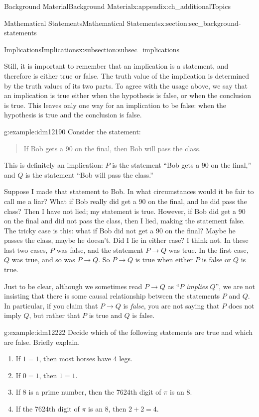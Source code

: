 \documentclass[oneside,10pt,]{book}
\numberwithin{equation}{chapter}
\def\imp{\rightarrow}
\begin{document}
\begin{appendixptx}{Background Material}{}{Background Material}{}{}{x:appendix:ch_additionalTopics}
\begin{sectionptx}{Mathematical Statements}{}{Mathematical Statements}{}{}{x:section:sec_background-statements}
\begin{subsectionptx}{Implications}{}{Implications}{}{}{x:subsection:subsec_implications}
\par
Still, it is important to remember that an implication is a statement, and therefore is either true or false. The truth value of the implication is determined by the truth values of its two parts. To agree with the usage above, we say that an implication is true either when the hypothesis is false, or when the conclusion is true. This leaves only one way for an implication to be false: when the hypothesis is true and the conclusion is false.%
\begin{example}{}{g:example:idm12190}%
Consider the statement:%
\begin{quote}%
If Bob gets a 90 on the final, then Bob will pass the class.%
\end{quote}
This is definitely an implication: \(P\) is the statement ``Bob gets a 90 on the final,'' and \(Q\) is the statement ``Bob will pass the class.''%
\par
Suppose I made that statement to Bob. In what circumstances would it be fair to call me a liar? What if Bob really did get a 90 on the final, and he did pass the class? Then I have not lied; my statement is true. However, if Bob did get a 90 on the final and did not pass the class, then I lied, making the statement false. The tricky case is this: what if Bob did not get a 90 on the final? Maybe he passes the class, maybe he doesn't. Did I lie in either case? I think not. In these last two cases, \(P\) was false, and the statement \(P \imp Q\) was true. In the first case, \(Q\) was true, and so was \(P \imp Q\). So \(P \imp Q\) is true when either \(P\) is false or \(Q\) is true.%
\end{example}
Just to be clear, although we sometimes read \(P \imp Q\) as ``\(P\) \emph{implies} \(Q\)'', we are not insisting that there is some causal relationship between the statements \(P\) and \(Q\). In particular, if you claim that \(P \imp Q\) is \emph{false}, you are not saying that \(P\) does not imply \(Q\), but rather that \(P\) is true and \(Q\) is false.%
\begin{example}{}{g:example:idm12222}%
Decide which of the following statements are true and which are false. Briefly explain.%
\begin{enumerate}
\item{}If \(1=1\), then most horses have 4 legs.%
\item{}If \(0=1\), then \(1=1\).%
\item{}If 8 is a prime number, then the 7624th digit of \(\pi\) is an 8.%
\item{}If the 7624th digit of \(\pi\) is an 8, then \(2+2 = 4\).%

\end{enumerate}
\end{example}
\end{subsectionptx}
\end{sectionptx}
\end{appendixptx}
\end{document}
